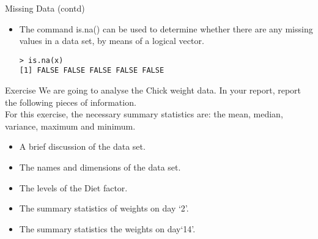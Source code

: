 \documentclass[pdf,default,slideColor,colorBG]{prosper}
\begin{document}
\begin{slide}{Missing Data (contd)}
\begin{itemize}
\item The command is.na() can be used to determine whether there
are any missing values in a data set, by means of a logical
vector.

\begin{verbatim}
> is.na(x)
[1] FALSE FALSE FALSE FALSE FALSE
\end{verbatim}
\end{itemize}
\end{slide}
\begin{slide}{Exercise}
We are going to analyse the Chick weight data.
In your report, report the following pieces of information.
\\
For this exercise, the necessary summary statistics are: the mean, median, variance, maximum and minimum.

\begin{itemize}
    \item A brief discussion of the data set.
    \item The names and dimensions of the data set.
    \item The levels of the Diet factor.
    \item The summary statistics of weights on day `2'.
    \item The summary statistics the weights on day`14'.
\end{itemize}

\end{slide}
\end{document}
